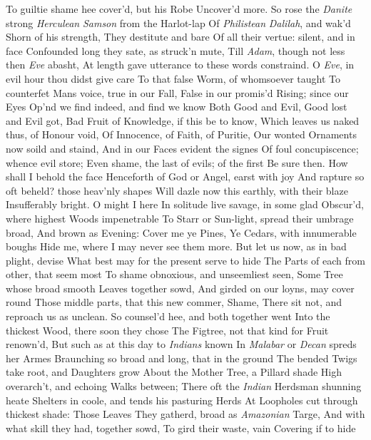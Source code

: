 \documentclass[11pt]{book}
\newcounter {first}
\newcounter {last}
\begin{document}
To guiltie shame hee cover'd, but his Robe 
Uncover'd more.  So rose the \textit{Danite} strong 
\textit{Herculean} \textit{Samson} from the Harlot-lap 
Of \textit{Philistean} \textit{Dalilah}, and wak'd 
Shorn of his strength, They destitute and bare 
Of all their vertue: silent, and in face 
Confounded long they sate, as struck'n mute, 
Till \textit{Adam}, though not less then \textit{Eve} abasht, 
At length gave utterance to these words constraind. 
\quad O \textit{Eve}, in evil hour thou didst give care 
To that false Worm, of whomsoever taught 
To counterfet Mans voice, true in our Fall, 
False in our promis'd Rising; since our Eyes 
Op'nd we find indeed, and find we know 
Both Good and Evil, Good lost and Evil got, 
Bad Fruit of Knowledge, if this be to know, 
Which leaves us naked thus, of Honour void, 
Of Innocence, of Faith, of Puritie, 
Our wonted Ornaments now soild and staind, 
And in our Faces evident the signes 
Of foul concupiscence; whence evil store; 
Even shame, the last of evils; of the first 
Be sure then.  How shall I behold the face 
Henceforth of God or Angel, earst with joy 
And rapture so oft beheld? those heav'nly shapes 
Will dazle now this earthly, with their blaze 
Insufferably bright.  O might I here 
In solitude live savage, in some glad 
Obscur'd, where highest Woods impenetrable 
To Starr or Sun-light, spread their umbrage broad, 
And brown as Evening: Cover me ye Pines, 
Ye Cedars, with innumerable boughs 
Hide me, where I may never see them more. 
But let us now, as in bad plight, devise 
What best may for the present serve to hide 
The Parts of each from other, that seem most 
To shame obnoxious, and unseemliest seen, 
Some Tree whose broad smooth Leaves together sowd, 
And girded on our loyns, may cover round 
Those middle parts, that this new commer, Shame, 
There sit not, and reproach us as unclean. 
\quad So counsel'd hee, and both together went 
Into the thickest Wood, there soon they chose 
The Figtree, not that kind for Fruit renown'd, 
But such as at this day to \textit{Indians} known 
In \textit{Malabar} or \textit{Decan} spreds her Armes 
Braunching so broad and long, that in the ground 
The bended Twigs take root, and Daughters grow 
About the Mother Tree, a Pillard shade 
High overarch't, and echoing Walks between; 
There oft the \textit{Indian} Herdsman shunning heate 
Shelters in coole, and tends his pasturing Herds 
At Loopholes cut through thickest shade: Those Leaves 
They gatherd, broad as \textit{Amazonian} Targe, 
And with what skill they had, together sowd, 
To gird their waste, vain Covering if to hide 
\end{document}
